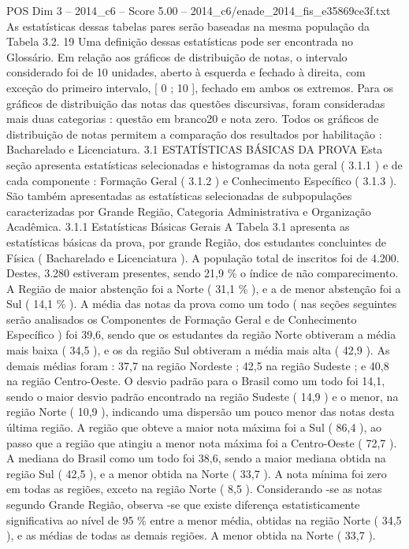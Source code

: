 \begin{textsample}{POS Dim 3 – 2014\_c6 – Score 5.00 – 2014\_c6/enade\_2014\_fis\_e35869ce3f.txt}
As estatísticas dessas tabelas pares serão baseadas na mesma população da Tabela 3.2. 19 Uma definição dessas estatísticas pode ser encontrada no Glossário.
Em relação aos gráficos de distribuição de notas, o intervalo considerado foi de 10 unidades, aberto à esquerda e fechado à direita, com exceção do primeiro intervalo, [ 0 ; 10 ], fechado em ambos os extremos.
Para os gráficos de distribuição das notas das questões discursivas, foram consideradas mais duas categorias : questão em branco20 e nota zero.
Todos os gráficos de distribuição de notas permitem a comparação dos resultados por habilitação : Bacharelado e Licenciatura. 3.1 ESTATÍSTICAS BÁSICAS DA PROVA Esta seção apresenta estatísticas selecionadas e histogramas da nota geral ( 3.1.1 ) e de cada componente : Formação Geral ( 3.1.2 ) e Conhecimento Específico ( 3.1.3 ).
São também apresentadas as estatísticas selecionadas de subpopulações caracterizadas por Grande Região, Categoria Administrativa e Organização Acadêmica. 3.1.1 Estatísticas Básicas Gerais A Tabela 3.1 apresenta as estatísticas básicas da prova, por grande Região, dos estudantes concluintes de Física ( Bacharelado e Licenciatura ).
A população total de inscritos foi de 4.200.
Destes, 3.280 estiveram presentes, sendo 21,9 \% o índice de não comparecimento.
A Região de maior abstenção foi a Norte ( 31,1 \% ), e a de menor abstenção foi a Sul ( 14,1 \% ).
A média das notas da prova como um todo ( nas seções seguintes serão analisados os Componentes de Formação Geral e de Conhecimento Específico ) foi 39,6, sendo que os estudantes da região Norte obtiveram a média mais baixa ( 34,5 ), e os da região Sul obtiveram a média mais alta ( 42,9 ).
As demais médias foram : 37,7 na região Nordeste ; 42,5 na região Sudeste ; e 40,8 na região Centro-Oeste.
O desvio padrão para o Brasil como um todo foi 14,1, sendo o maior desvio padrão encontrado na região Sudeste ( 14,9 ) e o menor, na região Norte ( 10,9 ), indicando uma dispersão um pouco menor das notas desta última região.
A região que obteve a maior nota máxima foi a Sul ( 86,4 ), ao passo que a região que atingiu a menor nota máxima foi a Centro-Oeste ( 72,7 ).
A mediana do Brasil como um todo foi 38,6, sendo a maior mediana obtida na região Sul ( 42,5 ), e a menor obtida na Norte ( 33,7 ).
A nota mínima foi zero em todas as regiões, exceto na região Norte ( 8,5 ).
Considerando -se as notas segundo Grande Região, observa -se que existe diferença estatisticamente significativa ao nível de 95 \% entre a menor média, obtidas na região Norte ( 34,5 ), e as médias de todas as demais regiões.
A menor obtida na Norte ( 33,7 ).

\end{textsample}

